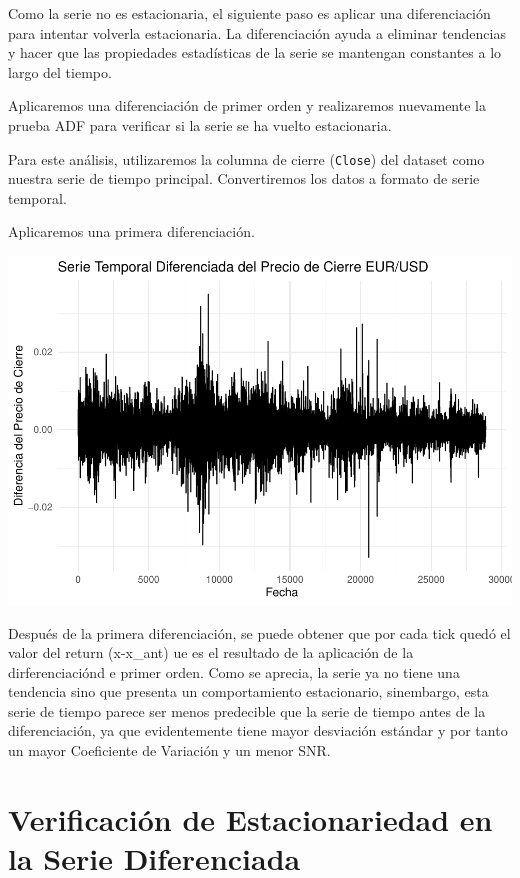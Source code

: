 \documentclass[
]{book}
\begin{document}
Como la serie no es estacionaria, el siguiente paso es aplicar una diferenciación para intentar volverla estacionaria. La diferenciación ayuda a eliminar tendencias y hacer que las propiedades estadísticas de la serie se mantengan constantes a lo largo del tiempo.

Aplicaremos una diferenciación de primer orden y realizaremos nuevamente la prueba ADF para verificar si la serie se ha vuelto estacionaria.

Para este análisis, utilizaremos la columna de cierre (\texttt{Close}) del dataset como nuestra serie de tiempo principal. Convertiremos los datos a formato de serie temporal.

Aplicaremos una primera diferenciación.

\includegraphics{bookdown_time_series_files/figure-latex/differencing-1.pdf}

Después de la primera diferenciación, se puede obtener que por cada tick quedó el valor del return (x-x\_ant) ue es el resultado de la aplicación de la dirferenciaciónd e primer orden. Como se aprecia, la serie ya no tiene una tendencia sino que presenta un comportamiento estacionario, sinembargo, esta serie de tiempo parece ser menos predecible que la serie de tiempo antes de la diferenciación, ya que evidentemente tiene mayor desviación estándar y por tanto un mayor Coeficiente de Variación y un menor SNR.

\section{Verificación de Estacionariedad en la Serie Diferenciada}\label{verificaciuxf3n-de-estacionariedad-en-la-serie-diferenciada}
\end{document}
